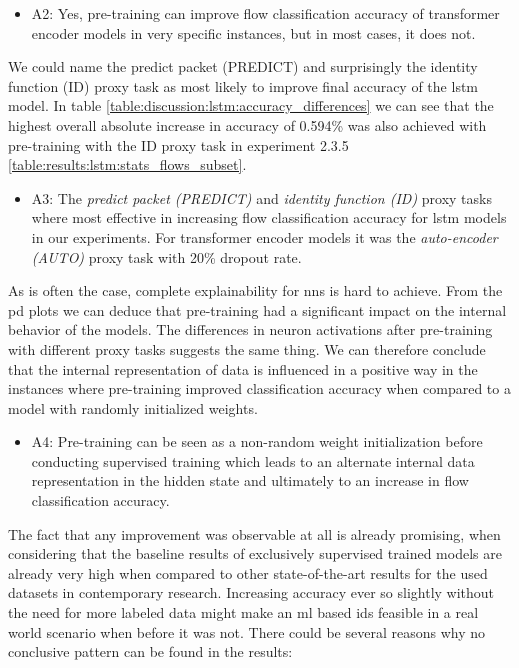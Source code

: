 \begin{itemize}
	\item A2: Yes, pre-training can improve flow classification accuracy of transformer encoder models in very specific instances, but in most cases, it does not.
\end{itemize}

We could name the predict packet (PREDICT) and surprisingly the identity function (ID) proxy task as most likely to improve final accuracy of the \gls{lstm} model. In table \ref{table:discussion:lstm:accuracy_differences} we can see that the highest overall absolute increase in accuracy of 0.594\% was also achieved with pre-training with the ID proxy task in experiment 2.3.5 \ref{table:results:lstm:stats_flows_subset}. \par

\begin{itemize}
	\item A3: The \textit{predict packet (PREDICT)} and \textit{identity function (ID)} proxy tasks where most effective in increasing flow classification accuracy for \gls{lstm} models in our experiments. For transformer encoder models it was the \textit{auto-encoder (AUTO)} proxy task with 20\% dropout rate.
\end{itemize}

As is often the case, complete explainability for \glspl{nn} is hard to achieve. From the \gls{pd} plots we can deduce that pre-training had a significant impact on the internal behavior of the models. The differences in neuron activations after pre-training with different proxy tasks suggests the same thing. We can therefore conclude that the internal representation of data is influenced in a positive way in the instances where pre-training improved classification accuracy when compared to a model with randomly initialized weights.

\begin{itemize}
	\item A4: Pre-training can be seen as a non-random weight initialization before conducting supervised training which leads to an alternate internal data representation in the hidden state and ultimately to an increase in flow classification accuracy.
\end{itemize}

The fact that any improvement was observable at all is already promising, when considering that the baseline results of exclusively supervised trained models are already very high when compared to other state-of-the-art results for the used datasets in contemporary research. Increasing accuracy ever so slightly without the need for more labeled data might make an \gls{ml} based \gls{ids} feasible in a real world scenario when before it was not. There could be several reasons why no conclusive pattern can be found in the results: \par

